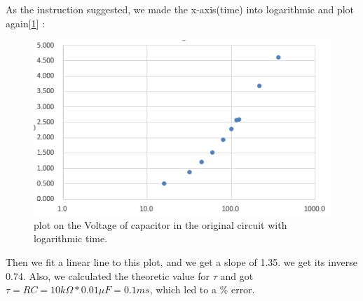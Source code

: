\phantom{ } As the instruction suggested, we made the x-axis(time) into logarithmic and plot again[\ref{fig:2.2}] :\\
\begin{figure}[htbp]
	\centering %
	\includegraphics[width=\linewidth]{images/2_2.PNG} %
	\caption{plot on the Voltage of capacitor in the original circuit with logarithmic time.} %
	\label{fig:2.2} %
\end{figure}
\phantom{ } Then we fit a linear line to this plot, and we get a slope of 1.35.
we get its inverse 0.74. Also, we calculated the theoretic value for $\tau$ and got\\
$\tau = RC = 10k\Omega * 0.01\mu F = 0.1ms$, which led to a \% error.
\phantom{ } 


